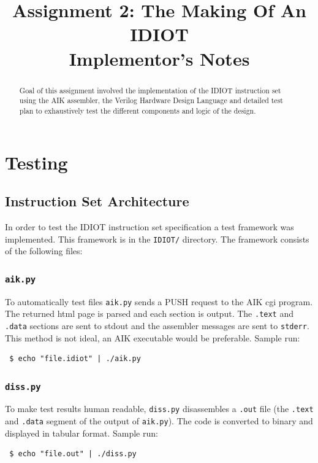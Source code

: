 \documentclass[conference]{IEEEtran}
\begin{document}
\title{Assignment 2: The Making Of An IDIOT\\Implementor's Notes}
\author{
        }

\maketitle

\begin{abstract}
Goal of this assignment involved the implementation of the IDIOT instruction set
using the AIK assembler, the Verilog Hardware Design Language and detailed test
plan to exhaustively test the different components and logic of the design. 
\end{abstract}

\section{Testing}
\subsection{Instruction Set Architecture}
In order to test the IDIOT instruction set specification a test framework was
implemented. This framework is in the \texttt{IDIOT/} directory. The framework
consists of the following files:
\subsubsection{\texttt{aik.py}}
To automatically test files \texttt{aik.py} sends a PUSH request to the
AIK cgi program. The returned html page is parsed and each section is output.
The \texttt{.text} and \texttt{.data} sections are sent to stdout and the
assembler messages are sent to \texttt{stderr}. This method is not ideal, an
AIK executable would be preferable. Sample run:
\begin{verbatim}
 $ echo "file.idiot" | ./aik.py
\end{verbatim}
\subsubsection{\texttt{diss.py}}
To make test results human readable, \texttt{diss.py} disassembles a 
\texttt{.out} file (the \texttt{.text} and \texttt{.data} segment of the 
output of \texttt{aik.py}). The code is converted to binary and displayed in
tabular format. Sample run:
\begin{verbatim}
 $ echo "file.out" | ./diss.py
\end{verbatim}
\end{document}
